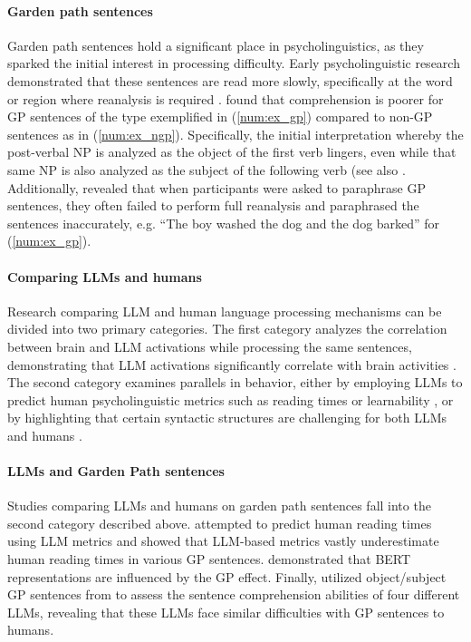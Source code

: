 \paragraph{Garden path sentences} Garden path sentences hold a significant place in psycholinguistics, as they sparked the initial interest in processing difficulty. Early psycholinguistic research demonstrated that these sentences are read more slowly, specifically at the word or region where reanalysis is required \cite{gp3, gp2, gp1}. \citet{christianson2001} found that  comprehension is poorer for GP sentences of the type exemplified in (\ref{num:ex_gp}) compared to non-GP sentences as in (\ref{num:ex_ngp}). Specifically, the initial interpretation whereby the post-verbal NP is analyzed as the object of the first verb lingers, even while that same NP is also analyzed as the subject of the following verb (see also \citet{christianson2006}. Additionally, \citet{patson2009lingering} revealed that when participants were asked to paraphrase GP sentences, they often failed to perform full reanalysis and paraphrased the sentences inaccurately, e.g. ``The boy washed the dog and the dog barked'' for (\ref{num:ex_gp}). 

\paragraph{Comparing LLMs and humans} Research comparing LLM and human language processing mechanisms can be divided into two primary categories. The first category analyzes the correlation between brain and LLM activations while processing the same sentences, demonstrating that LLM activations significantly correlate with brain activities \cite{cacheteux-middle-layer, fedorenko_brain_corr, Ren2024DoLL}. The second category examines parallels in behavior, either by employing LLMs to predict human psycholinguistic metrics such as reading times \cite{Rego2024LanguageMO, Sun2024ComputationalSM} or learnability \cite{island_learnability}, or by highlighting that certain syntactic structures are challenging for both LLMs and humans \cite{neural-lms-subjects, wilcox-gpt2-abilities}.

\paragraph{LLMs and Garden Path sentences} Studies comparing LLMs and humans on garden path sentences fall into the second category described above. \citet{gp_reading_time} attempted to predict human reading times using LLM metrics and showed that LLM-based metrics vastly underestimate human reading times in various GP sentences. \citet{bert_gp} demonstrated that BERT representations are influenced by the GP effect. Finally, \citet{Li2024IncrementalCO} utilized object/subject GP sentences from \cite{christianson2001} to assess the sentence comprehension abilities of four different LLMs, revealing that these LLMs face similar difficulties with GP sentences to humans.